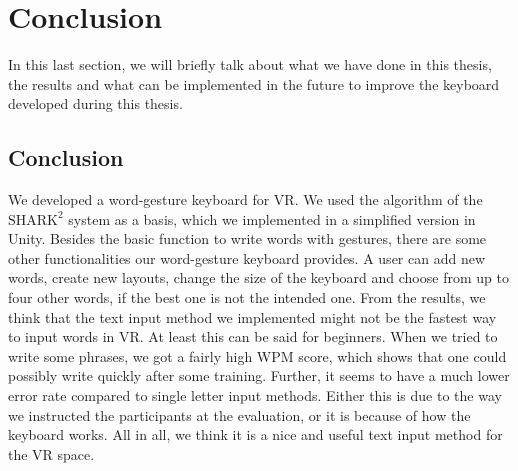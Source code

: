 \chapter{Conclusion}

In this last section, we will briefly talk about what we have done in this thesis, the results and what can be implemented in the future to improve the keyboard developed during this thesis.

\section{Conclusion}
We developed a word-gesture keyboard for VR. We used the algorithm of the $\text{SHARK}^2$ system \cite{Kristensson2004SHARK2AL} as a basis, which we implemented in a simplified version in Unity. Besides the basic function to write words with gestures, there are some other functionalities our word-gesture keyboard provides. A user can add new words, create new layouts, change the size of the keyboard and choose from up to four other words, if the best one is not the intended one. From the results, we think that the text input method we implemented might not be the fastest way to input words in VR. At least this can be said for beginners. When we tried to write some phrases, we got a fairly high WPM score, which shows that one could possibly write quickly after some training. Further, it seems to have a much lower error rate compared to single letter input methods. Either this is due to the way we instructed the participants at the evaluation, or it is because of how the keyboard works. All in all, we think it is a nice and useful text input method for the VR space.

